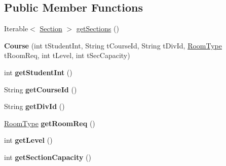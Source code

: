 \subsection*{Public Member Functions}
\begin{DoxyCompactItemize}
\item 
Iterable$<$ \hyperlink{interfaceosd_1_1input_1_1_section}{Section} $>$ \hyperlink{interfaceosd_1_1input_1_1_course_ad8e1f791bfa78ae2cca7fda58135abb3}{get\-Sections} ()
\item 
\hypertarget{interfaceosd_1_1input_1_1_course_a200dcd97e20382d4ac5ca3732e2f84e0}{{\bfseries Course} (int t\-Student\-Int, String t\-Course\-Id, String t\-Div\-Id, \hyperlink{interfaceosd_1_1input_1_1_room_type}{Room\-Type} t\-Room\-Req, int t\-Level, int t\-Sec\-Capacity)}\label{interfaceosd_1_1input_1_1_course_a200dcd97e20382d4ac5ca3732e2f84e0}

\item 
\hypertarget{interfaceosd_1_1input_1_1_course_ac1dcc39824df2cddceb725fe8531bec3}{int {\bfseries get\-Student\-Int} ()}\label{interfaceosd_1_1input_1_1_course_ac1dcc39824df2cddceb725fe8531bec3}

\item 
\hypertarget{interfaceosd_1_1input_1_1_course_a44efc9e443011bb27cb6a87d472ee975}{String {\bfseries get\-Course\-Id} ()}\label{interfaceosd_1_1input_1_1_course_a44efc9e443011bb27cb6a87d472ee975}

\item 
\hypertarget{interfaceosd_1_1input_1_1_course_a741123d10fa05510e8ffe793c2bbb2c3}{String {\bfseries get\-Div\-Id} ()}\label{interfaceosd_1_1input_1_1_course_a741123d10fa05510e8ffe793c2bbb2c3}

\item 
\hypertarget{interfaceosd_1_1input_1_1_course_a79f3e81e08205484f6858c56f988c2f2}{\hyperlink{interfaceosd_1_1input_1_1_room_type}{Room\-Type} {\bfseries get\-Room\-Req} ()}\label{interfaceosd_1_1input_1_1_course_a79f3e81e08205484f6858c56f988c2f2}

\item 
\hypertarget{interfaceosd_1_1input_1_1_course_ab24a202369530a57e1c0693d3eb26b2d}{int {\bfseries get\-Level} ()}\label{interfaceosd_1_1input_1_1_course_ab24a202369530a57e1c0693d3eb26b2d}

\item 
\hypertarget{interfaceosd_1_1input_1_1_course_a8d56da278fcb942ffd7427a9865fb3ea}{int {\bfseries get\-Section\-Capacity} ()}\label{interfaceosd_1_1input_1_1_course_a8d56da278fcb942ffd7427a9865fb3ea}

\end{DoxyCompactItemize}



